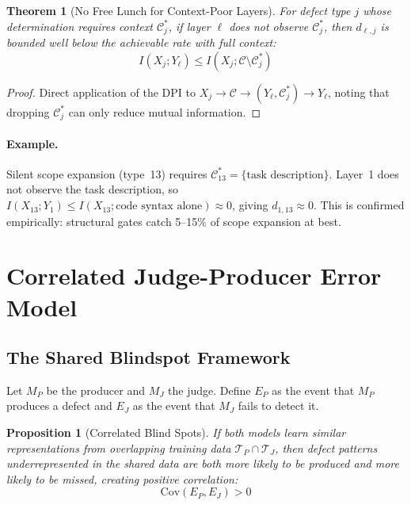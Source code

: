 \documentclass[11pt, a4paper, copyright]{googledeepmind}
\newtheorem{theorem}{Theorem}[section]
\newtheorem{proposition}{Proposition}[section]
\begin{document}
\begin{theorem}[No Free Lunch for Context-Poor Layers]
\label{thm:nofreelunch}
For defect type $j$ whose determination requires context $\mathcal{C}_j^*$, if layer $\ell$ does not observe $\mathcal{C}_j^*$, then $d_{\ell,j}$ is bounded well below the achievable rate with full context:
\begin{equation}
I(X_j; Y_\ell) \leq I(X_j; \mathcal{C} \setminus \mathcal{C}_j^*)
\end{equation}
\end{theorem}

\begin{proof}
Direct application of the DPI to $X_j \to \mathcal{C} \to (Y_\ell, \mathcal{C}_j^*) \to Y_\ell$, noting that dropping $\mathcal{C}_j^*$ can only reduce mutual information.
\end{proof}

\paragraph{Example.} Silent scope expansion (type~13) requires $\mathcal{C}_{13}^* = \{\text{task description}\}$. Layer~1 does not observe the task description, so $I(X_{13}; Y_1) \leq I(X_{13}; \text{code syntax alone}) \approx 0$, giving $d_{1,13} \approx 0$. This is confirmed empirically: structural gates catch 5--15\% of scope expansion at best.


\section{Correlated Judge-Producer Error Model}
\label{sec:correlation}

\subsection{The Shared Blindspot Framework}

Let $M_P$ be the producer and $M_J$ the judge. Define $E_P$ as the event that $M_P$ produces a defect and $E_J$ as the event that $M_J$ fails to detect it.

\begin{proposition}[Correlated Blind Spots]
\label{prop:correlated}
If both models learn similar representations from overlapping training data $\mathcal{T}_P \cap \mathcal{T}_J$, then defect patterns underrepresented in the shared data are both more likely to be produced and more likely to be missed, creating positive correlation:
\begin{equation}
\mathrm{Cov}(E_P, E_J) > 0
\end{equation}
\end{proposition}
\end{document}
